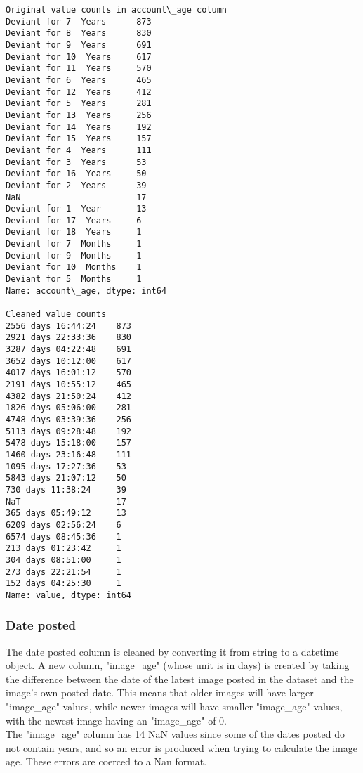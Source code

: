 \documentclass[11pt]{article}
\begin{document}
    \begin{Verbatim}[commandchars=\\\{\},fontsize=\footnotesize]
Original value counts in account\_age column
Deviant for 7  Years      873
Deviant for 8  Years      830
Deviant for 9  Years      691
Deviant for 10  Years     617
Deviant for 11  Years     570
Deviant for 6  Years      465
Deviant for 12  Years     412
Deviant for 5  Years      281
Deviant for 13  Years     256
Deviant for 14  Years     192
Deviant for 15  Years     157
Deviant for 4  Years      111
Deviant for 3  Years      53
Deviant for 16  Years     50
Deviant for 2  Years      39
NaN                       17
Deviant for 1  Year       13
Deviant for 17  Years     6
Deviant for 18  Years     1
Deviant for 7  Months     1
Deviant for 9  Months     1
Deviant for 10  Months    1
Deviant for 5  Months     1
Name: account\_age, dtype: int64

Cleaned value counts
2556 days 16:44:24    873
2921 days 22:33:36    830
3287 days 04:22:48    691
3652 days 10:12:00    617
4017 days 16:01:12    570
2191 days 10:55:12    465
4382 days 21:50:24    412
1826 days 05:06:00    281
4748 days 03:39:36    256
5113 days 09:28:48    192
5478 days 15:18:00    157
1460 days 23:16:48    111
1095 days 17:27:36    53
5843 days 21:07:12    50
730 days 11:38:24     39
NaT                   17
365 days 05:49:12     13
6209 days 02:56:24    6
6574 days 08:45:36    1
213 days 01:23:42     1
304 days 08:51:00     1
273 days 22:21:54     1
152 days 04:25:30     1
Name: value, dtype: int64

    \end{Verbatim}
\newpage
   \subsubsection{ Date posted}

The date posted column is cleaned by converting it from string to a
datetime object. A new column, "image\_age" (whose unit is in days) is
created by taking the difference between the date of the latest image
posted in the dataset and the image's own posted date. This means that
older images will have larger "image\_age" values, while newer images
will have smaller "image\_age" values, with the newest image having an
"image\_age" of 0.\\

The "image\_age" column has 14 NaN values since some of the dates posted
do not contain years, and so an error is produced when trying to
calculate the image age. These errors are coerced to a Nan format.
\end{document}
